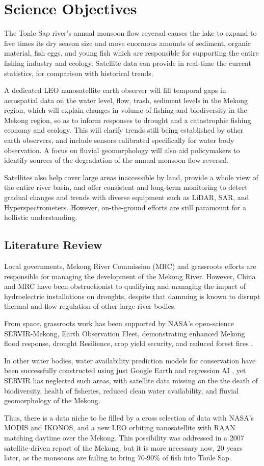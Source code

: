 \section{Science Objectives}
The Tonle Sap river's annual monsoon flow reversal causes the lake to expand to five times its dry season size and move enormous amounts of sediment, organic material, fish eggs, and young fish \citep{Regan2021} which are responsible for supporting the entire fishing industry and ecology. Satellite data can provide in real-time the current statistics, for comparison with historical trends.

A dedicated LEO nanosatellite earth observer will fill temporal gaps in aerospatial data on the water level, flow, trash, sediment levels in the Mekong region, which will explain changes in volume of fishing and biodiversity in the Mekong region, so as to inform responses to drought and a catastrophic fishing economy and ecology. This will clarify trends still being established by other earth observers, and include sensors calibrated specifically for water body observation. A focus on fluvial geomorphology will also aid policymakers to identify sources of the degradation of the annual monsoon flow reversal.

Satellites also help cover large areas inaccessible by land, provide a whole view of the entire river basin, and offer consistent and long-term monitoring to detect gradual changes and trends with diverse equipment such as LiDAR, SAR, and Hyperspectrometers. However, on-the-ground efforts are still paramount for a hollistic understanding.

\subsection{Literature Review}
Local governments, Mekong River Commission (MRC) and grassroots efforts are responsible for managing the development of the Mekong River. However, China and MRC have been obstructionist to qualifying and managing the impact of hydroelectric installations on droughts, despite that damming is known to disrupt thermal and flow regulation of other large river bodies. \citep{Yang2022}

From space, grassroots work has been supported by NASA's open-science SERVIR-Mekong, Earth Observation Fleet, demonstrating enhanced Mekong flood response, drought Resilience, crop yield security, and reduced forest fires \citep{SERVIR-Mekong}.

In other water bodies, water availability prediction models for conservation have been successfully constructed using just Google Earth and regression AI \citep{Evans2021}, yet SERVIR has neglected such areas, with satellite data missing on the the death of biodiversity, health of fisheries, reduced clean water availability, and fluvial geomorphology of the Mekong.

Thus, there is a data niche to be filled by a cross selection of data with NASA's MODIS and IKONOS, and a new LEO orbiting nanosatellite with RAAN matching daytime over the Mekong. This possibility was addressed in a 2007 satellite-driven report of the Mekong\citep{Gupta2007}, but it is more necessary now, 20 years later, as the monsoons are failing to bring 70-90\% of fish into Tonle Sap.